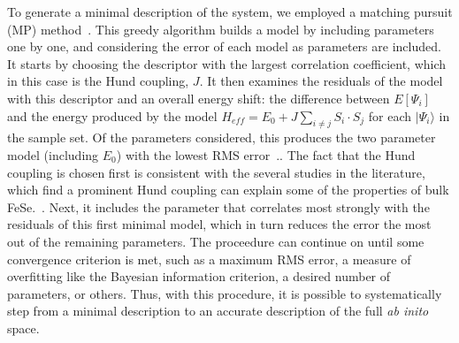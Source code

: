 To generate a minimal description of the system, we employed a matching pursuit (MP) method~\cite{MP_Zhang1993}.
This greedy algorithm builds a model by including parameters one by one, and considering the error of each model as parameters are included.
It starts by choosing the descriptor with the largest correlation coefficient, which in this case is the Hund coupling, $J$.
It then examines the residuals of the model with this descriptor and an overall energy shift: the difference between $E[\Psi_i]$ and the energy produced by the model $H_{eff} = E_0 + J \sum_{i\ne j}S_i \cdot S_j$ for each $|\Psi_i\rangle$ in the sample set.
Of the parameters considered, this produces the two parameter model (including $E_0$) with the lowest RMS error~\cite{MP_Zhang1993}..
The fact that the Hund coupling is chosen first is consistent with the several studies in the literature, which find a prominent Hund coupling can explain some of the properties of bulk FeSe.~\cite{demedici_hunds_2011,de_medici_janus-faced_2011,georges_strong_2013,busemeyer_competing_2016}.
Next, it includes the parameter that correlates most strongly with the residuals of this first minimal model, which in turn reduces the error the most out of the remaining parameters. 
The proceedure can continue on until some convergence criterion is met, such as a maximum RMS error, a measure of overfitting like the Bayesian information criterion, a desired number of parameters, or others.
Thus, with this procedure, it is possible to systematically step from a minimal description to an accurate description of the full \textit{ab inito} space.

